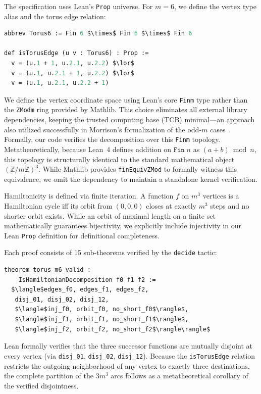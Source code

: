 \documentclass[11pt]{article}
\theoremstyle{plain}
\begin{document}
The specification uses Lean's \texttt{Prop} universe. For $m=6$, we
define the vertex type alias and the torus edge relation:
\begin{lstlisting}[language=ML,mathescape=true]
abbrev Torus6 := Fin 6 $\times$ Fin 6 $\times$ Fin 6

def isTorusEdge (u v : Torus6) : Prop :=
  v = (u.1 + 1, u.2.1, u.2.2) $\lor$
  v = (u.1, u.2.1 + 1, u.2.2) $\lor$
  v = (u.1, u.2.1, u.2.2 + 1)
\end{lstlisting}
We define the vertex coordinate space using Lean's core
\texttt{Fin\;m} type rather than the \texttt{ZMod\;m} ring provided by
Mathlib. This choice eliminates all external library dependencies,
keeping the trusted computing base (TCB) minimal---an approach also
utilized successfully in Morrison's formalization of the odd-$m$
cases~\cite{morrison2026}. Formally, our code verifies
the decomposition over this \texttt{Fin\;m} topology.
Metatheoretically, because Lean~4 defines addition on $\texttt{Fin}\;n$
as $(a + b) \bmod n$, this topology is structurally identical to the
standard mathematical object $(\mathbb{Z}/m\mathbb{Z})^3$. While
Mathlib provides \texttt{finEquivZMod} to formally witness this
equivalence, we omit the dependency to maintain a standalone kernel
verification.

Hamiltonicity is defined via finite iteration. A function $f$ on $m^3$
vertices is a Hamiltonian cycle iff its orbit from $(0,0,0)$ closes at
exactly $m^3$ steps and no shorter orbit exists. While an orbit of
maximal length on a finite set mathematically guarantees bijectivity,
we explicitly include injectivity in our Lean \texttt{Prop} definition
for definitional completeness.

Each proof consists of 15 sub-theorems verified by the \texttt{decide}
tactic:
\begin{lstlisting}[language=ML,mathescape=true]
theorem torus_m6_valid :
    IsHamiltonianDecomposition f0 f1 f2 :=
  $\langle$edges_f0, edges_f1, edges_f2,
   disj_01, disj_02, disj_12,
   $\langle$inj_f0, orbit_f0, no_short_f0$\rangle$,
   $\langle$inj_f1, orbit_f1, no_short_f1$\rangle$,
   $\langle$inj_f2, orbit_f2, no_short_f2$\rangle\rangle$
\end{lstlisting}

Lean formally verifies that the three successor functions are
mutually disjoint at every vertex (via \texttt{disj\_01},
\texttt{disj\_02}, \texttt{disj\_12}). Because the
\texttt{isTorusEdge} relation restricts the outgoing neighborhood
of any vertex to exactly three destinations, the complete partition
of the $3m^3$ arcs follows as a metatheoretical corollary of the
verified disjointness.
\end{document}
